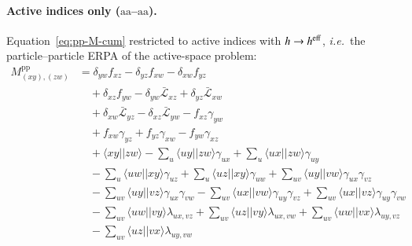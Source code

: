 \documentclass[aip,jcp,reprint,noshowkeys,superscriptaddress]{revtex4-1}
\newcommand{\ie}{\textit{i.e.}}
\newcommand{\pp}{\text{pp}}
\newcommand{\saa}{\text{aa}}
\begin{document}
\paragraph*{Active indices only ($\saa$--$\saa$).}
Equation~\eqref{eq:pp-M-cum} restricted to active indices with $h\to h^{\rm eff}$,
\ie\ the particle--particle ERPA of the active-space problem:
\begin{align}
  M^{\pp}_{(xy),(zw)} &= \delta_{yw}f_{xz} -\delta_{yz}f_{xw} -\delta_{xw}f_{yz} \nonumber\\
  &\quad +\delta_{xz}f_{yw} -\delta_{yw}\bar{\mathcal L}_{xz} +\delta_{yz}\bar{\mathcal L}_{xw} \nonumber\\
  &\quad +\delta_{xw}\bar{\mathcal L}_{yz} -\delta_{xz}\bar{\mathcal L}_{yw} -f_{xz}\gamma_{yw} \nonumber\\
  &\quad +f_{xw}\gamma_{yz} +f_{yz}\gamma_{xw} -f_{yw}\gamma_{xz} \nonumber\\
  &\quad +\langle xy||zw\rangle -\sum_{u}\langle uy||zw\rangle\gamma_{ux} +\sum_{u}\langle ux||zw\rangle\gamma_{uy} \nonumber\\
  &\quad -\sum_{u}\langle uw||xy\rangle\gamma_{uz} +\sum_{u}\langle uz||xy\rangle\gamma_{uw} +\sum_{uv}\langle uy||vw\rangle\gamma_{ux}\gamma_{vz} \nonumber\\
  &\quad -\sum_{uv}\langle uy||vz\rangle\gamma_{ux}\gamma_{vw} -\sum_{uv}\langle ux||vw\rangle\gamma_{uy}\gamma_{vz} +\sum_{uv}\langle ux||vz\rangle\gamma_{uy}\gamma_{vw} \nonumber\\
  &\quad -\sum_{uv}\langle uw||vy\rangle\lambda_{ux,vz} +\sum_{uv}\langle uz||vy\rangle\lambda_{ux,vw} +\sum_{uv}\langle uw||vx\rangle\lambda_{uy,vz} \nonumber\\
  &\quad -\sum_{uv}\langle uz||vx\rangle\lambda_{uy,vw}
  \label{eq:pp-aa-aa}
\end{align}
\end{document}
